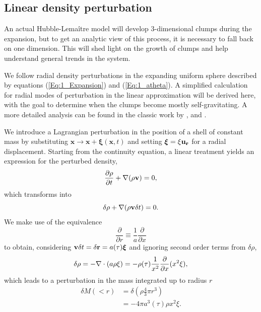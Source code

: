  
\subsection{Linear density perturbation}
\label{Sub:1_FragmentationModes}
An actual Hubble-Lema\^itre model will develop 3-dimensional clumps during the expansion, but to get an analytic view of this process, it is necessary to fall back on one dimension. This will shed light on the growth of clumps and help understand general trends in the system.

We follow radial density perturbations in the expanding uniform sphere described by equations (\ref{Eq:1_Expansion}) and (\ref{Eq:1_atheta}). A simplified calculation for radial modes of perturbation in the linear approximation will be derived here, with the goal to determine when the clumps become mostly self-gravitating. A more detailed analysis can be found in the classic work by \cite{Friedman1978}, \cite{Peebles1980} and \cite{Aarseth1988}.

We introduce a Lagrangian perturbation in the position of a shell of constant mass by substituting $\mathbf{x} \rightarrow \mathbf{x} + \boldsymbol\xi(\mathbf{x},t)$ and setting $\boldsymbol\xi = \xi \bold{u_r}$ for a radial displacement. Starting from the continuity equation, a linear treatment yields an expression for the perturbed density,
\begin{equation}
\frac{\partial \rho}{\partial t} + \nabla(\rho \bold{v}) = 0, 
\end{equation}
which transforms into
\begin{equation}
\delta \rho + \nabla (\rho \bold{v} \delta t) = 0.
\end{equation}
We make use of the equivalence
\begin{equation}
\label{Eq:1_derivequiv}
\frac{\partial}{\partial r} \equiv \frac{1}{a} \frac{\partial}{\partial x}
\end{equation}
to obtain, considering $ \bold{v} \delta t = \delta \bold{r} = a(\tau) \boldsymbol\xi$ and ignoring second order terms from $\delta \rho$,
\begin{equation} 
\label{Eq:1_DeltaRho} 
\delta\rho = - \mathbf{\nabla}\cdot (a\rho\mathbf{\xi}) =  - \rho(\tau) \frac{1}{x^2}\frac{\partial}{\partial x} ( x^2\xi ),
\end{equation}
which leads to a perturbation in  the mass integrated up to radius $r$ 
\begin{align}
\delta M(<r) &= \delta \left( \rho \frac{4}{3} \pi r^3 \right)\\
    &= - 4\pi a^3(\tau) \rho x^2 \xi . 
\end{align}


